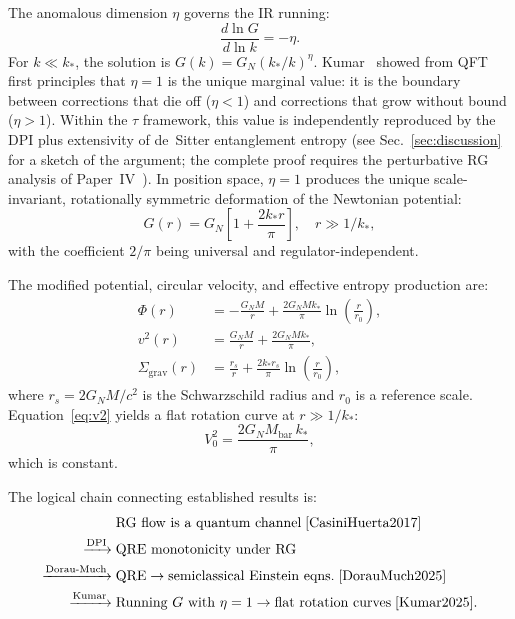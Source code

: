 \documentclass[prd,twocolumn,superscriptaddress,longbibliography,floatfix]{revtex4-2}
\newcommand{\tauasym}{\tau}
\begin{document}
The anomalous dimension $\eta$ governs the IR running:
\begin{equation}
\frac{d\ln G}{d\ln k} = -\eta.
\label{eq:anomalous}
\end{equation}
For $k \ll k_*$, the solution is
$G(k) = G_N(k_*/k)^\eta$.
Kumar~\cite{Kumar2025} showed from QFT first principles that
$\eta = 1$ is the unique marginal value: it is the boundary
between corrections that die off ($\eta < 1$) and corrections
that grow without bound ($\eta > 1$).  Within the $\tauasym$
framework, this value is independently reproduced by the DPI
plus extensivity of de~Sitter entanglement entropy
(see Sec.~\ref{sec:discussion} for a sketch of the argument;
the complete proof requires the perturbative RG analysis
of Paper~IV~\cite{Paper4}).  In position space, $\eta = 1$ produces the
unique scale-invariant, rotationally symmetric deformation
of the Newtonian potential:
\begin{equation}
G(r) = G_N\!\left[1 + \frac{2k_* r}{\pi}\right],
\quad r \gg 1/k_*,
\label{eq:G_running}
\end{equation}
with the coefficient $2/\pi$ being universal and
regulator-independent.

The modified potential, circular velocity, and effective
entropy production are:
\begin{align}
\Phi(r) &= -\frac{G_N M}{r} +
\frac{2G_N M k_*}{\pi}\ln\!\left(\frac{r}{r_0}\right),
\label{eq:phi}\\
v^2(r) &= \frac{G_N M}{r} +
\frac{2G_N M k_*}{\pi},
\label{eq:v2}\\
\Sigma_{\mathrm{grav}}(r) &= \frac{r_s}{r} +
\frac{2k_* r_s}{\pi}\ln\!\left(\frac{r}{r_0}\right),
\label{eq:sigma_grav}
\end{align}
where $r_s = 2G_N M/c^2$ is the Schwarzschild radius and
$r_0$ is a reference scale.  Equation~\eqref{eq:v2} yields
a flat rotation curve at $r \gg 1/k_*$:
\begin{equation}
V_0^2 = \frac{2G_N M_{\mathrm{bar}}\, k_*}{\pi},
\label{eq:V0}
\end{equation}
which is constant.

The logical chain connecting established results is:
\begin{align}
&\text{RG flow is a quantum channel}
\;\cite{CasiniHuerta2017}
\nonumber\\
\xrightarrow{\mathrm{DPI}}\;&
\text{QRE monotonicity under RG}
\nonumber\\
\xrightarrow{\mathrm{Dorau\text{-}Much}}\;&
\text{QRE} \to \text{semiclassical Einstein eqns.}
\;\cite{DorauMuch2025}
\nonumber\\
\xrightarrow{\mathrm{Kumar}}\;&
\text{Running }G\text{ with }\eta=1
\to \text{flat rotation curves}
\;\cite{Kumar2025}.
\nonumber
\end{align}
\end{document}
